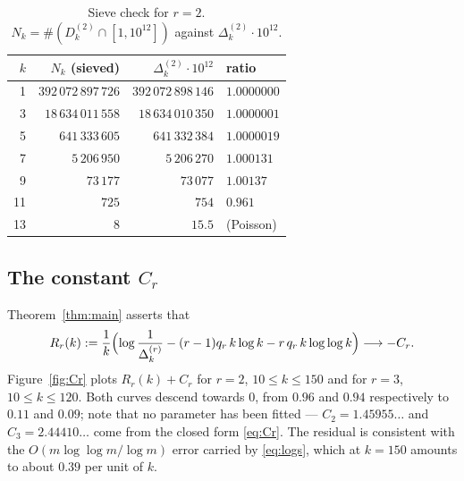 \documentclass[10pt,a4paper]{amsart}
\numberwithin{equation}{section}
\begin{document}
\begin{table}[ht]
\caption{Sieve check for $r=2$. $N_k=\#(D^{(2)}_k\cap[1,10^{12}])$ against
$\Delta^{(2)}_k\cdot10^{12}$.}
\label{tab:sieve}
\begin{tabular}{rrrl}
\toprule
$k$ & $N_k$ (sieved) & $\Delta^{(2)}_k\cdot10^{12}$ & ratio\\
\midrule
1 & $392\,072\,897\,726$ & $392\,072\,898\,146$ & $1.0000000$\\
3 & $18\,634\,011\,558$ & $18\,634\,010\,350$ & $1.0000001$\\
5 & $641\,333\,605$ & $641\,332\,384$ & $1.0000019$\\
7 & $5\,206\,950$ & $5\,206\,270$ & $1.000131$\\
9 & $73\,177$ & $73\,077$ & $1.00137$\\
11 & $725$ & $754$ & $0.961$\\
13 & $8$ & $15.5$ & (Poisson)\\
\bottomrule
\end{tabular}
\end{table}

\subsection{The constant $C_r$}\label{sub:Cr}
Theorem~\ref{thm:main} asserts that
\[
  R_r(k):=\frac1k\Bigl(\log\frac1{\Delta^{(r)}_k}-(r-1)q_r\,k\log k
  -r\,q_r\,k\log\log k\Bigr)\longrightarrow -C_r .
\]
Figure~\ref{fig:Cr} plots $R_r(k)+C_r$ for $r=2$, $10\le k\le150$ and for $r=3$,
$10\le k\le120$. Both curves descend towards $0$, from $0.96$ and $0.94$ respectively to
$0.11$ and $0.09$; note that no parameter has been fitted --- $C_2=1.45955\ldots$ and
$C_3=2.44410\ldots$ come from the closed form \eqref{eq:Cr}. The residual is consistent
with the $O(m\log\log m/\log m)$ error carried by \eqref{eq:logs}, which at $k=150$
amounts to about $0.39$ per unit of $k$.
\end{document}
